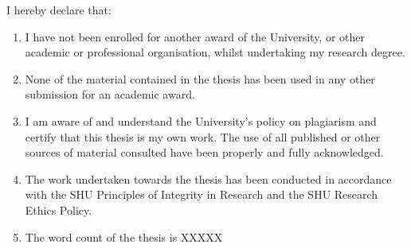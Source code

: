 

I hereby declare that:
\begin{enumerate}
    \item I have not been enrolled for another award of the University, or other
academic or professional organisation, whilst undertaking my research
degree.
    \item None of the material contained in the thesis has been used in any other
submission for an academic award.
    \item I am aware of and understand the University's policy on plagiarism and
certify that this thesis is my own work. The use of all published or other
sources of material consulted have been properly and fully
acknowledged.
    \item The work undertaken towards the thesis has been conducted in
accordance with the SHU Principles of Integrity in Research and the
SHU Research Ethics Policy.
    \item The word count of the thesis is XXXXX
\end{enumerate}

\vspace{5cm}

